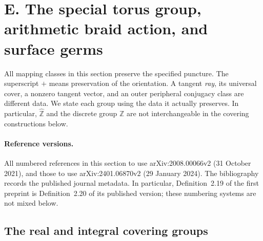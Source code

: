 \section{E. The special torus group, arithmetic braid action, and surface germs}
\label{sec:E}

All mapping classes in this section preserve the specified puncture.
The superscript $+$ means preservation of the orientation.  A tangent
\emph{ray}, its universal cover, a nonzero tangent vector, and an outer
peripheral conjugacy class are different data.  We state each group
using the data it actually preserves.  In particular, $\widehat{\mathbb Z}$
and the discrete group $\mathbb Z$ are not interchangeable in the
covering constructions below.

\paragraph{Reference versions.}
All numbered references in this section to
\citet{DolgushevLeLorenz2024} use arXiv:2008.00066v2
(31 October 2021), and those to \citet{DolgushevGuynee2024}
use arXiv:2401.06870v2 (29 January 2024). The bibliography
records the published journal metadata. In particular, Definition~2.19
of the first preprint is Definition~2.20 of its published version;
these numbering systems are not mixed below.

\subsection{The real and integral covering groups}


